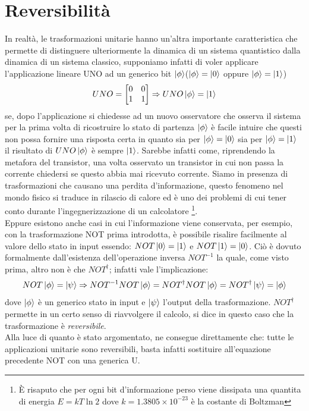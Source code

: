 \documentclass[12pt,a4paper,openright]{report}
\begin{document}
\section{Reversibilità}
In realtà, le trasformazioni unitarie hanno un'altra importante caratteristica che permette di distinguere ulteriormente la dinamica di un sistema quantistico
dalla dinamica di un sistema classico, supponiamo infatti di voler applicare l'applicazione lineare UNO ad un generico bit $\ket{\phi}$($\ket{\phi}=\ket0$ oppure $\ket{\phi}=\ket1$)
\[
UNO=
    \begin{bmatrix}
        0 & 0\\
        1 & 1 
    \end{bmatrix}
    \Rightarrow
    UNO\ket{\phi} = \ket1
\]
se, dopo l'applicazione si chiedesse ad un nuovo osservatore che osserva il sistema per la prima volta di ricostruire lo stato di partenza $\ket{\phi}$
è facile intuire che questi non possa fornire una risposta certa in quanto sia per $\ket{\phi}=\ket0$ sia per $\ket{\phi}=\ket1$ il risultato di $UNO\ket{\phi}$
è sempre $\ket{1}$. Sarebbe infatti come, riprendendo la metafora del transistor, una volta osservato un transistor in cui non passa la
corrente chiedersi se questo abbia mai ricevuto corrente. Siamo in presenza di trasformazioni che causano una perdita d'informazione,
questo fenomeno nel mondo fisico si traduce in rilascio di calore ed è uno dei problemi di cui tener conto durante l'ingegnerizzazione di un calcolatore \footnote{È risaputo che per ogni bit d'informazione perso viene dissipata una quantita di energia $E = kT\ln2$ dove $k=1.3805\times10^{-23}$ è la costante di Boltzman}. \\ 
Eppure esistono anche casi in cui l'informazione viene conservata, per esempio, con la trasformazione NOT prima introdotta, è possibile risalire facilmente al 
valore dello stato in input essendo: $NOT\ket0 = \ket1$ e $NOT\ket1 = \ket0$. Ciò è dovuto formalmente dall'esistenza dell'operazione inversa $NOT^{-1}$ la quale,
come visto prima, altro non è che $NOT^{\dag}$; infatti vale l'implicazione: \[NOT\ket{\phi}=\ket{\psi}\Rightarrow NOT^{-1}NOT\ket{\phi}= NOT^{\dag}NOT\ket{\phi}=NOT^{\dag}\ket{\psi}=\ket{\phi}\] dove 
$\ket{\phi}$ è un generico stato in input e $\ket{\psi}$ l'output della trasformazione. $NOT^{\dag}$ permette in un certo senso di riavvolgere il calcolo, si dice in questo caso che
la trasformazione è \emph{reversibile}.\\
Alla luce di quanto è stato argomentato, ne consegue direttamente che: tutte le applicazioni unitarie sono reversibili, basta infatti sostituire all'equazione precedente NOT con una generica U. 
\end{document}

